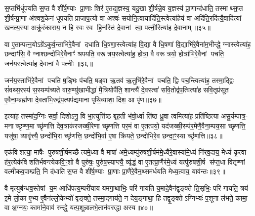 {\anuvakamend[{तेनै॒व लोम॑भिः॒ समे॒ते अ॑भि॒चर॑त॒ एक॑विशतिश्च॥६॥}]}

स॒प्तभि॑र्धूपयति स॒प्त वै शी॑र्\mbox{}ष॒ण्याः प्रा॒णाः शिर॑ ए॒तद्य॒ज्ञस्य॒ यदु॒खा शी॒र्\mbox{}षन्ने॒व य॒ज्ञस्य॑ प्रा॒णान्द॑धाति॒ तस्माथ्स॒प्त शी॒र्\mbox{}षन्प्रा॒णा अ॑श्वश॒केन॑ धूपयति प्राजाप॒त्यो वा अश्वः॑ सयोनि॒त्वायादि॑ति॒स्त्वेत्या॑हे॒यं वा अदि॑ति॒रदि॑त्यै॒वादि॑त्यां खनत्य॒स्या अक्रू॑रंकाराय॒ न हि स्वः स्व हि॒नस्ति॑ दे॒वानां त्वा॒ पत्नी॒रित्या॑ह दे॒वानाम्॥३५॥

वा ए॒ताम्पत्न॒योऽग्रे॑ऽकुर्व॒न्ताभि॑रे॒वैनां दधाति धि॒षणा॒स्त्वेत्या॑ह वि॒द्या वै धि॒षणा॑ वि॒द्याभि॑रे॒वैना॑म॒भीन्द्धे॒ ग्नास्त्वेत्या॑ह॒ छन्दाꣳ॑सि॒ वै ग्नाश्छन्दो॑भिरे॒वैनाꣳ॑ श्रपयति॒ वरूत्रय॒स्त्वेत्या॑ह॒ होत्रा॒ वै वरूत्रयो॒ होत्रा॑भिरे॒वैनां पचति॒ जन॑य॒स्त्वेत्या॑ह दे॒वानां॒ वै पत्नीः॥३६॥

जन॑य॒स्ताभि॑रे॒वैनां पचति ष॒ड्भिः प॑चति॒ षड्वा ऋ॒तव॑ ऋ॒तुभि॑रे॒वैनां पचति॒ द्विः पच॒न्त्वित्या॑ह॒ तस्मा॒द्द्विः सं॑वथ्स॒रस्य॑ स॒स्यम्प॑च्यते वारु॒ण्यु॑खाभीद्धा॑ मै॒त्रियोपै॑ति॒ शान्त्यै॑ दे॒वस्त्वा॑ सवि॒तोद्व॑प॒त्वित्या॑ह सवि॒तृप्र॑सूत ए॒वैना॒म्ब्रह्म॑णा दे॒वता॑भि॒रुद्व॑प॒त्यप॑द्यमाना पृथि॒व्याशा॒ दिश॒ आ पृ॑ण॥३७॥

इत्या॑ह॒ तस्मा॑द॒ग्निः सर्वा॒ दिशोऽनु॒ वि भा॒त्युत्ति॑ष्ठ बृह॒ती भ॑वो॒र्ध्वा ति॑ष्ठ ध्रु॒वा त्वमित्या॑ह॒ प्रति॑ष्ठित्या असु॒र्य॑म्पात्र॒- मनाच्छृण्ण॒मा च्छृ॑णत्ति देव॒त्राक॑रजख्षी॒रेणा च्छृ॑णत्ति पर॒मं वा ए॒तत्पयो॒ यद॑जख्षी॒रम्प॑र॒मेणै॒वैना॒म्पय॒सा च्छृ॑णत्ति॒ यजु॑षा॒ व्यावृ॑त्त्यै॒ छन्दो॑भि॒रा च्छृ॑णत्ति॒ छन्दो॑भि॒र्वा ए॒षा क्रि॑यते॒ छन्दो॑भिरे॒व छन्दा॒ꣳ॒स्या च्छृ॑णत्ति॥३८॥

{\anuvakamend[{आ॒ह॒ दे॒वानां॒ वै पत्नीः पृणै॒षा षट्च॑॥७॥}]}

एक॑विशत्या॒ माषैः पुरुषशी॒र्\mbox{}षमच्छैत्यमे॒ध्या वै माषा॑ अमे॒ध्यम्पु॑रुषशी॒र्\mbox{}षम॑मे॒ध्यैरे॒वास्या॑मे॒ध्यं नि॑रव॒दाय॒ मेध्यं॑ कृ॒त्वा ह॑र॒त्येक॑विशतिर्भवन्त्येकवि॒ꣳ॒शो वै पुरु॑षः॒ पुरु॑ष॒स्याप्त्यै॒ व्यृ॑द्धं॒ वा ए॒तत्प्रा॒णैर॑मे॒ध्यं यत्पु॑रुषशी॒र्\mbox{}ष स॑प्त॒धा वितृ॑ण्णां वल्मीकव॒पाम्प्रति॒ नि द॑धाति स॒प्त वै शी॑र्\mbox{}ष॒ण्याः प्रा॒णाः प्रा॒णैरे॒वैन॒थ्सम॑र्धयति मेध्य॒त्वाय॒ याव॑न्तः॥३९॥

वै मृ॒त्युब॑न्धव॒स्तेषां य॒म आधि॑पत्य॒म्परी॑याय यमगा॒थाभिः॒ परि॑ गायति य॒मादे॒वैन॑द्वृङ्क्ते ति॒सृभिः॒ परि॑ गायति॒ त्रय॑ इ॒मे लो॒का ए॒भ्य ए॒वैन॑ल्लो॒केभ्यो॑ वृङ्क्ते॒ तस्मा॒द्गाय॑ते॒ न देय॒ङ्गाथा॒ हि तद्वृ॒ङ्क्तेऽग्निभ्यः॑ प॒शूना ल॑भते॒ कामा॒ वा अ॒ग्नयः॒ कामा॑ने॒वाव॑ रुन्द्धे॒ यत्प॒शून्नालभे॒तान॑वरुद्धा अस्य॥४०॥

